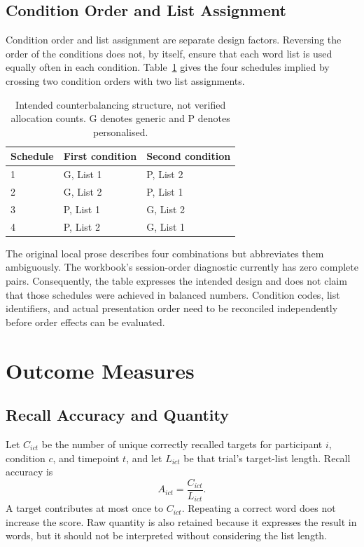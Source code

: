 \subsection{Condition Order and List Assignment}
Condition order and list assignment are separate design factors. Reversing the order of the conditions does not, by itself, ensure that each word list is used equally often in each condition. Table~\ref{tab:counterbalance} gives the four schedules implied by crossing two condition orders with two list assignments.

\begin{table}[htbp]
\centering
\caption{Intended counterbalancing structure, not verified allocation counts. G denotes generic and P denotes personalised.}
\label{tab:counterbalance}
\begin{tabular}{lll}
\toprule
Schedule & First condition & Second condition \\
\midrule
1 & G, List 1 & P, List 2 \\
2 & G, List 2 & P, List 1 \\
3 & P, List 1 & G, List 2 \\
4 & P, List 2 & G, List 1 \\
\bottomrule
\end{tabular}
\end{table}

The original local prose describes four combinations but abbreviates them ambiguously. The workbook's session-order diagnostic currently has zero complete pairs. Consequently, the table expresses the intended design and does not claim that those schedules were achieved in balanced numbers. Condition codes, list identifiers, and actual presentation order need to be reconciled independently before order effects can be evaluated.

\section{Outcome Measures}
\subsection{Recall Accuracy and Quantity}
Let $C_{ict}$ be the number of unique correctly recalled targets for participant $i$, condition $c$, and timepoint $t$, and let $L_{ict}$ be that trial's target-list length. Recall accuracy is
\begin{equation}
A_{ict}=\frac{C_{ict}}{L_{ict}}.
\end{equation}
A target contributes at most once to $C_{ict}$. Repeating a correct word does not increase the score. Raw quantity is also retained because it expresses the result in words, but it should not be interpreted without considering the list length.

